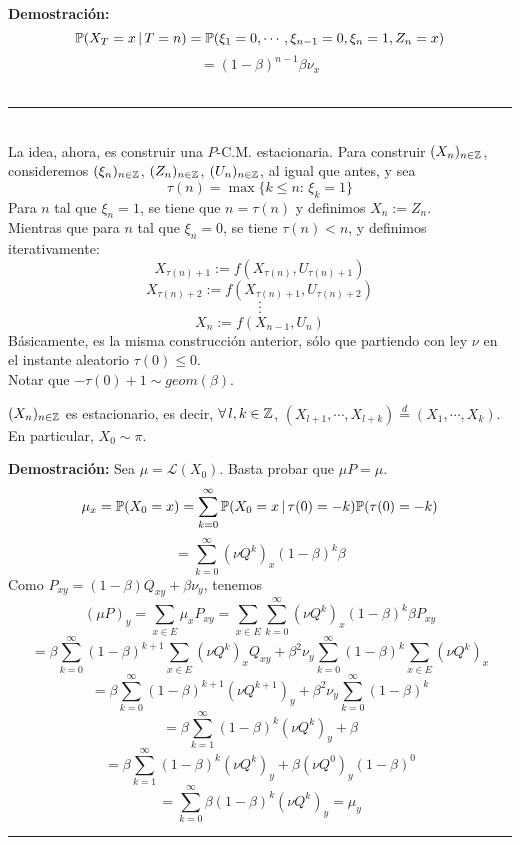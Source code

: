 \textbf{Demostración: }
\[\mathbb{P}(X_T = x\,|\,T=n) = \mathbb{P}(\xi_1 = 0,\cdots,\xi_{n-1}=0,\xi_n=1,Z_n=x)\]
\[ = (1-\beta)^{n-1}\beta \nu_x\]\\
\rule{0.7em}{0.7em}\\ \newline
La idea, ahora, es construir una $P$-C.M. estacionaria. Para construir $(X_n)_{n\in \mathbb Z}$, consideremos $(\xi_n)_{n\in \mathbb Z}$, $(Z_n)_{n\in \mathbb Z}$, $(U_n)_{n\in \mathbb Z}$, al igual que antes, y sea
\[\tau(n) = \max\{k\leq n:\,\xi_k=1\}\]
Para $n$ tal que  $\xi_n = 1$, se tiene que  $n=\tau(n)$ y definimos $X_n:=Z_n$.\\ Mientras que para $n$ tal que $\xi_n =0$, se tiene $\tau(n)<n$, y definimos iterativamente:
\[X_{\tau(n)+1}:= f(X_{\tau(n)},U_{\tau(n)+1})\]
\[X_{\tau(n)+2}:= f(X_{\tau(n)+1},U_{\tau(n)+2})\]
\[\cdot\]
\[\cdot\]
\[\cdot\]
\[X_n:= f(X_{n-1},U_n)\]
Básicamente, es la misma construcción  anterior, sólo que partiendo  con ley $\nu$ en el instante aleatorio $\tau(0)\leq 0$.\\ \newline
Notar que $-\tau(0)+1 \sim geom(\beta)$.
\begin{prop}
$(X_n)_{n\in \mathbb Z}$ es estacionario, es decir, $\forall\, l,k\in \mathbb Z$, $(X_{l+1},\cdots,X_{l+k}) \overset{\,d\,}{=}(X_1,\cdots,X_k)$.\\ En particular, $X_0\sim \pi$.
\end{prop}

\textbf{Demostración: }Sea $\mu = \mathcal{L}(X_0)$. Basta probar que $\mu P = \mu$.
\[\mu_x = \mathbb{P}(X_0=x) = \sum_{k=0}^{\infty}\mathbb{P}(X_0=x\,|\,\tau(0)=-k)\mathbb{P}(\tau(0)=-k)\]
\[= \sum_{k=0}^{\infty}(\nu Q^k)_x (1-\beta)^{k}\beta\]
Como $P_{xy} = (1-\beta)Q_{xy} + \beta \nu_y$, tenemos
\[(\mu P)_y = \sum_{x\in E}\mu_x P_{xy} = \sum_{x\in E}\sum_{k=0}^{\infty}(\nu Q^k)_x(1-\beta)^k\beta P_{xy}\]
\[= \beta \sum_{k=0}^{\infty}(1-\beta)^{k+1}\sum_{x\in E}(\nu Q^k)_xQ_{xy} + \beta^2 \nu_y \sum_{k=0}^{\infty}(1-\beta)^k\sum_{x\in E}(\nu Q^k)_x\]
\[= \beta\sum_{k=0}^{\infty}(1-\beta)^{k+1}(\nu Q^{k+1})_y + \beta^2\nu_y\sum_{k=0}^{\infty}(1-\beta)^k\]
\[= \beta\sum_{k=1}^{\infty}(1-\beta)^{k}(\nu Q^{k})_y + \beta\]
\[= \beta\sum_{k=1}^{\infty}(1-\beta)^{k}(\nu Q^{k})_y + \beta(\nu Q^0)_y(1-\beta)^0\]
\[= \sum_{k=0}^{\infty}\beta(1-\beta)^{k}(\nu Q^{k})_y = \mu_y\]
\rule{0.7em}{0.7em}\\ \newline
